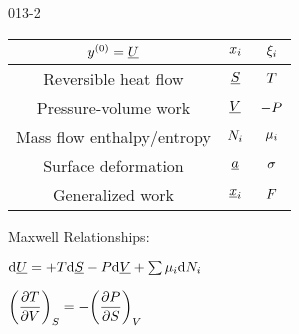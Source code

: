 \begin{mitframe}{013-2}  %

    

\begin{longtable}{ | c | c | c | } 
 \hline
 	$ y^{(0)}= \uline{\intenergy}$& $\conjcoor$ & $\conjcoortwo_{\state}$ \\ \hline
	Reversible heat flow & $\uline{\entropy}$ & $\Temp$ \\ \hline 
	Pressure-volume work & $\uline{\vol}$ & $-\p$  \\ \hline
 	Mass flow enthalpy/entropy& $\nummoles_{\state}$ & $\chempot_{\state}$ \\ \hline   
	Surface deformation & $\totalsa$ & $\surftens$ \\ \hline   
    Generalized work & $\gendisp_{\state}$ & $\force$ \\ \hline
 
 
\end{longtable}

    
    
\begin{listone}
        
    \item Maxwell Relationships:
        
    \item $\mathrm{d}\uline{\intenergy} = +\Temp\mathrm{d}\uline{\entropy} - \p\mathrm{d}\uline{\vol} + \sum\nolimits\chempot_{\state}\mathrm{d}\nummoles_{\state}$
         
    \item $\bigg(\dfrac{\partial\Temp}{\partial\vol}\bigg)_{\entropy} = -\bigg(\dfrac{\partial\p}{\partial\entropy}\bigg)_{\vol}$
    
\end{listone}			

\end{mitframe}